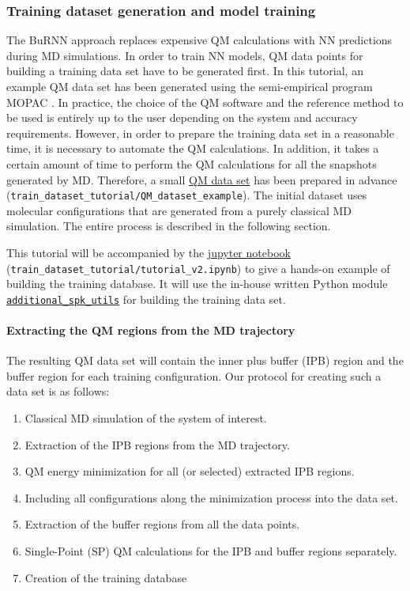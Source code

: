 \subsubsection{Training dataset generation and model training}
The BuRNN approach replaces expensive QM calculations with NN predictions during MD simulations. In order to train NN models, QM data points for building a training data set have to be generated first. In this tutorial, an example QM data set has been generated using the semi-empirical program MOPAC \cite{Stewart1990MOPAC, Stewart2013MOPAC}. In practice, the choice of the QM software and the reference method to be used is entirely up to the user depending on the system and accuracy requirements. However, in order to prepare the training data set in a reasonable time, it is necessary to automate the QM calculations. In addition, it takes a certain amount of time to perform the QM calculations for all the snapshots generated by MD. Therefore, a small \href{https://github.com/LierB/gromos_tutorial_livecoms/tree/burnn_tutorial_rc/tutorial_files/t_06/train_dataset_tutorial/QM_dataset_example}{QM data set} has been prepared in advance (\texttt{train\_dataset\_tutorial/QM\_dataset\_example}). The initial dataset uses molecular configurations that are generated from a purely classical MD simulation. The entire process is described in the following section.


This tutorial will be accompanied by the \href{https://github.com/LierB/gromos_tutorial_livecoms/blob/burnn_tutorial_rc/tutorial_files/t_06/train_dataset_tutorial/tutorial_v2.ipynb}{jupyter notebook} (\texttt{train\_dataset\_tutorial/tutorial\_v2.ipynb}) to give a hands-on example of building the training database. It will use the in-house written Python module \href{https://github.com/LierB/gromos_tutorial_livecoms/blob/burnn_tutorial_rc/tutorial_files/t_06/train_dataset_tutorial/additional_spk_utils.py}{\texttt{additional\_spk\_utils}} for building the training data set.


\paragraph{Extracting the QM regions from the MD trajectory}
The resulting QM data set will contain the inner plus buffer (IPB) region and the buffer region for each training configuration. Our protocol for creating such a data set is as follows: 
\begin{enumerate}
    \item Classical MD simulation of the system of interest.
    \item Extraction of the IPB regions from the MD trajectory.
    \item QM energy minimization for all (or selected) extracted IPB regions.
    \item Including all configurations along the minimization process into the data set.
    \item Extraction of the buffer regions from all the data points.
    \item Single-Point (SP) QM calculations for the IPB and buffer regions separately.
    \item Creation of the training database
\end{enumerate}


